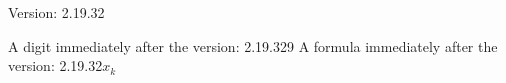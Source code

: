 \documentclass[a4paper, 12pt]{article}
\begin{document}
Version: 2.19.32

A digit immediately after the version: 2.19.329
A formula immediately after the version: 2.19.32$x_k$
\end{document}
